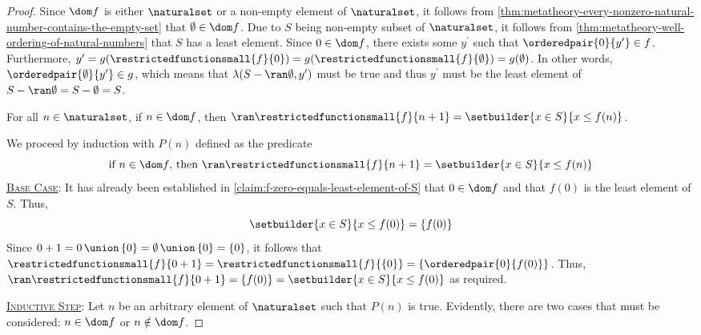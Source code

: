 \begin{proof}
    \noindent
    Since \( \dom f \) is either \( \naturalset \) or a non-empty element of \( \naturalset \),
    it follows from \cref{thm:metatheory-every-nonzero-natural-number-contains-the-empty-set} that \( \emptyset \in \dom f \).
    Due to \( S \) being non-empty subset of \( \naturalset \), it follows from \cref{thm:metatheory-well-ordering-of-natural-numbers}
    that \( S \) has a least element.
    Since \( 0 \in \dom f \), there exists some \( y^{\prime} \) such that \( \orderedpair{0}{y^{\prime}} \in f \).
    Furthermore, \( y^{\prime} = g( \restrictedfunctionsmall{f}{0} ) = g( \restrictedfunctionsmall{f}{\emptyset} ) = g(\emptyset) \).
    In other words, \( \orderedpair{\emptyset}{y^{\prime}} \in g \), which means that \( \lambda(S - \ran \emptyset, y^{\prime}) \) must be true
    and thus \( y^{\prime} \) must be the least element of \( S - \ran \emptyset = S - \emptyset = S \).

    \begin{claim}
         \label{claim:if-n-is-in-dom-f-then-the-range-of-f-restricted-to-n-plus-one-is-the-set-of-all-elements-of-S-that-are-less-than-or-equal-to-f-n}
        For all \( n \in \naturalset \), if \( n \in \dom f \), then \( \ran \restrictedfunctionsmall{f}{n + 1} = \setbuilder{x \in S}{x \leq f(n)} \).
    \end{claim}
    \noindent
    We proceed by induction with \( P(n) \) defined as the predicate
    \begin{equation*}
        \text{if \( n \in \dom f \), then \( \ran \restrictedfunctionsmall{f}{n + 1} = \setbuilder{x \in S}{x \leq f(n)} \)}
    \end{equation*}
    \noindent
    \underline{\scshape Base Case}:
    It has already been established in \cref{claim:f-zero-equals-least-element-of-S} that \( 0 \in \dom f \) and that \( f(0) \) is the least element of \( S \).
    Thus,
    \begin{equation*}
        \setbuilder{x \in S}{x \leq f(0)} = \mleft\{ f(0) \mright\}
    \end{equation*}
    Since \( 0 + 1 = 0 \,{\union}\, \mleft\{ 0 \mright\} = \emptyset \,{\union}\, \mleft\{ 0 \mright\} = \mleft\{ 0 \mright\} \),
    it follows that \( \restrictedfunctionsmall{f}{0 + 1} = \restrictedfunctionsmall{f}{\mleft\{ 0 \mright\}} = \mleft\{ \orderedpair{0}{f(0)} \mright\} \).
    Thus, \( \ran \restrictedfunctionsmall{f}{0 + 1} = \mleft\{ f(0) \mright\} = \setbuilder{x \in S}{x \leq f(0)} \) as required.

    \vspace{0.3cm}
    \noindent
    \underline{\scshape Inductive Step}:
    Let \( n \) be an arbitrary element of \( \naturalset \) such that \( P(n) \) is true.
    Evidently, there are two cases that must be considered: \( n \in \dom f \) or \( n \notin \dom f \).


\end{proof}
